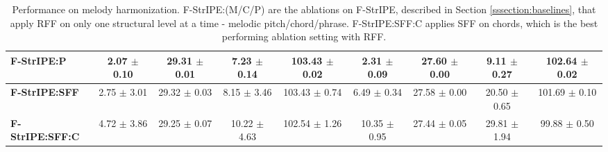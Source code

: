 \begin{table*}[t]
{\begin{tabular}{lcccccccc}
\multicolumn{1}{l|}{\textbf{F-StrIPE:P}} & \phantom{0}2.07 $\pm$ 0.10 & 29.31 $\pm$ 0.01 & \phantom{0}7.23 $\pm$ 0.14 & \multicolumn{1}{c|}{103.43 $\pm$ 0.02} & \phantom{0}2.31 $\pm$ 0.09 & 27.60 $\pm$ 0.00 & \phantom{0}9.11 $\pm$ 0.27 & \multicolumn{1}{c}{102.64 $\pm$ 0.02} \\ \hline
\multicolumn{1}{l|}{\textbf{F-StrIPE:SFF}} & \phantom{0}2.75 $\pm$ 3.01 & 29.32 $\pm$ 0.03 & \phantom{0}8.15 $\pm$ 3.46 & \multicolumn{1}{c|}{103.43 $\pm$ 0.74} & \phantom{0}6.49 $\pm$ 0.34 & 27.58 $\pm$ 0.00 & 20.50 $\pm$ 0.65 & \multicolumn{1}{c}{101.69 $\pm$ 0.10} \\
\multicolumn{1}{l|}{\textbf{F-StrIPE:SFF:C}} & \phantom{0}4.72 $\pm$ 3.86 & 29.25 $\pm$ 0.07 & 10.22 $\pm$ 4.63 & \multicolumn{1}{c|}{102.54 $\pm$ 1.26} & 10.35 $\pm$ 0.95 & 27.44 $\pm$ 0.05 & 29.81 $\pm$ 1.94 & \multicolumn{1}{c}{\phantom{0}99.88 $\pm$ 0.50} \\ \hline
\end{tabular}
}
\caption{Performance on melody harmonization. F-StrIPE:(M/C/P) are the ablations on F-StrIPE, described in Section \ref{sssection:baselines}, that apply RFF on only one structural level at a time - melodic pitch/chord/phrase. F-StrIPE:SFF:C applies SFF on chords, which is the best performing ablation setting with RFF.}
\label{tab:results_unrounded}
\end{table*}